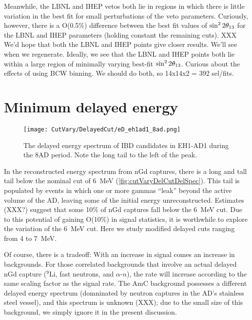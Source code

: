 \documentclass[../thesis.tex]{subfiles}
\begin{document}
Meanwhile, the LBNL and IHEP vetos both lie in regions in which there is little variation in the best fit for small perturbations of the veto parameters. Curiously, however, there is a O(0.5\%) difference between the best fit values of $\sin^2 2\theta_{13}$ for the LBNL and IHEP parameters (holding constant the remaining cuts). XXX We'd hope that both the LBNL and IHEP points give closer results. We'll see when we regenerate. Ideally, we see that the LBNL and IHEP points both lie within a large region of minimally varying best-fit $\sin^2 2\theta_{13}$. Curious about the effects of using BCW binning. We should do both, so 14x14x2 = 392 sel/fits.

\section{Minimum delayed energy}
\label{sec:cutVaryMinDelayed}

\begin{figure}[ht]
  \texttt{[image: CutVary/DelayedCut/eD\_eh1ad1\_8ad.png]}
  \caption{The delayed energy spectrum of IBD candidates in EH1-AD1 during the 8AD period. Note the long tail to the left of the peak.}
  \label{fig:cutVaryDelCutDelSpec}
\end{figure}

In the reconstructed energy spectrum from nGd captures, there is a long and tall tail below the nominal cut of 6~MeV (\autoref{fig:cutVaryDelCutDelSpec}). This tail is populated by events in which one or more gammas ``leak'' beyond the active volume of the AD, leaving some of the initial energy unreconstructed. Estimates (XXX?) suggest that some 10\% of nGd captures fall below the 6~MeV cut. Due to this potential of gaining O(10\%) in signal statistics, it is worthwhile to explore the variation of the 6~MeV cut. Here we study modified delayed cuts ranging from 4 to 7~MeV.

Of course, there is a tradeoff: With an increase in signal comes an increase in backgrounds. For those correlated backgrounds that involve an actual delayed nGd capture ($^9$Li, fast neutrons, and $\alpha$-$n$), the rate will increase according to the same scaling factor as the signal rate. The AmC background possesses a different delayed energy spectrum (domninated by neutron captures in the AD's stainless steel vessel), and this spectrum is unknown (XXX); due to the small size of this background, we simply ignore it in the present discussion.
\end{document}
